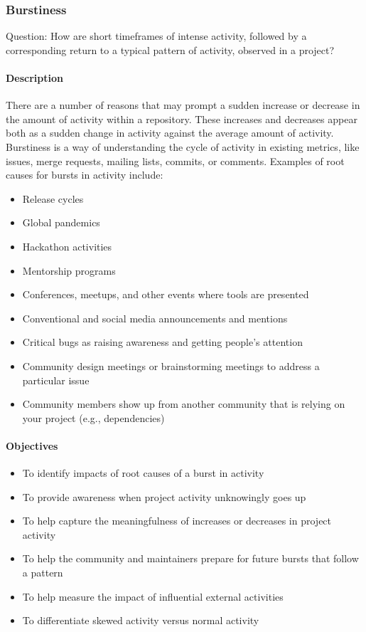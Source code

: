 \hypertarget{burstiness}{%
\subsubsection{Burstiness}\label{burstiness}}

Question: How are short timeframes of intense activity, followed by a
corresponding return to a typical pattern of activity, observed in a
project?

\hypertarget{description}{%
\paragraph{Description}\label{description}}

There are a number of reasons that may prompt a sudden increase or
decrease in the amount of activity within a repository. These increases
and decreases appear both as a sudden change in activity against the
average amount of activity. Burstiness is a way of understanding the
cycle of activity in existing metrics, like issues, merge requests,
mailing lists, commits, or comments. Examples of root causes for bursts
in activity include:

\begin{itemize}
\tightlist
\item
  Release cycles
\item
  Global pandemics
\item
  Hackathon activities
\item
  Mentorship programs
\item
  Conferences, meetups, and other events where tools are presented
\item
  Conventional and social media announcements and mentions
\item
  Critical bugs as raising awareness and getting people's attention
\item
  Community design meetings or brainstorming meetings to address a
  particular issue
\item
  Community members show up from another community that is relying on
  your project (e.g., dependencies)
\end{itemize}

\hypertarget{objectives}{%
\paragraph{Objectives}\label{objectives}}

\begin{itemize}
\tightlist
\item
  To identify impacts of root causes of a burst in activity
\item
  To provide awareness when project activity unknowingly goes up
\item
  To help capture the meaningfulness of increases or decreases in
  project activity
\item
  To help the community and maintainers prepare for future bursts that
  follow a pattern
\item
  To help measure the impact of influential external activities
\item
  To differentiate skewed activity versus normal activity
\end{itemize}

